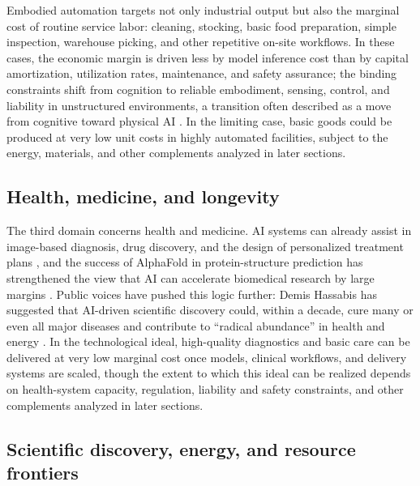 \documentclass[11pt]{article}
\begin{document}
Embodied automation targets not only industrial output but also the marginal cost of routine service labor: cleaning, stocking, basic food preparation, simple inspection, warehouse picking, and other repetitive on-site workflows. In these cases, the economic margin is driven less by model inference cost than by capital amortization, utilization rates, maintenance, and safety assurance; the binding constraints shift from cognition to reliable embodiment, sensing, control, and liability in unstructured environments, a transition often described as a move from cognitive toward physical AI \citep{NvidiaPhysicalAI}. In the limiting case, basic goods could be produced at very low unit costs in highly automated facilities, subject to the energy, materials, and other complements analyzed in later sections.

\subsection{\texorpdfstring{Health, medicine, and longevity}{Health, medicine, and longevity}}

The third domain concerns health and medicine. AI systems can already assist in image-based diagnosis, drug discovery, and the design of personalized treatment plans \citep{Topol2019}, and the success of AlphaFold in protein-structure prediction has strengthened the view that AI can accelerate biomedical research by large margins \citep{Jumper2021AlphaFold}. Public voices have pushed this logic further: Demis Hassabis has suggested that AI-driven scientific discovery could, within a decade, cure many or even all major diseases and contribute to ``radical abundance'' in health and energy \citep{Hassabis2025}. In the technological ideal, high-quality diagnostics and basic care can be delivered at very low marginal cost once models, clinical workflows, and delivery systems are scaled, though the extent to which this ideal can be realized depends on health-system capacity, regulation, liability and safety constraints, and other complements analyzed in later sections.

\subsection{Scientific discovery, energy, and resource frontiers}
\end{document}
